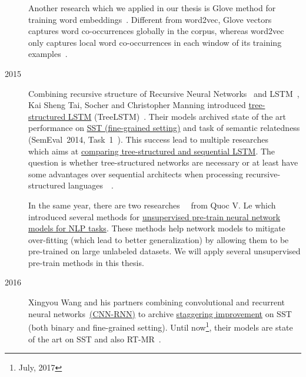 \begin{description}
Another research which we applied in our thesis is Glove method for training word embeddings~\cite{glove}.
Different from word2vec, Glove vectors captures word co-occurrences globally in the corpus, whereas word2vec only captures local word co-occurrences in each window of its training examples~\cite{glove}.

\item [2015] Combining recursive structure of Recursive Neural Networks~\cite{socher2013recursive} and LSTM~\cite{originLSTM}, Kai Sheng Tai, Socher and Christopher Manning introduced \hyperref[sec:treelstm]{tree-structured LSTM}  (TreeLSTM)~\cite{treeLSTM}.
Their models archived state of the art performance on \hyperref[sec:sst]{SST (fine-grained setting)} and task of semantic relatedness (SemEval~2014, Task~1~\cite{SemeEvalTask1}).
This success lead to multiple researches~\cite{need-tree}~\cite{bowman-treevslstm}~\cite{Graves_Nature2016} which aims at \hyperref[treelstm-advantage]{comparing tree-structured and sequential LSTM}. 
The question is whether tree-structured networks are necessary or at least have some advantages over sequential architects when processing recursive-structured languages~\cite{need-tree}~\cite{bowman-treevslstm}.   

In the same year, there are two researches~\cite{ParagraphVec}~\cite{semisup-seq2seq} from Quoc V. Le which introduced several methods for \hyperref[sec:unsupervised-pretrain]{unsupervised pre-train neural network models for NLP tasks}.
These methods help network models to mitigate over-fitting (which lead to better generalization) by allowing them to be pre-trained on large unlabeled datasets.
We will apply several unsupervised pre-train methods in this thesis.

\item [2016] Xingyou Wang and his partners combining convolutional and recurrent neural networks~\hyperref[cnn-rnn]{(CNN-RNN)} to archive \hyperref[table:cnn-rnn]{staggering improvement} on SST (both binary and fine-grained setting).
Until now\footnote{July, 2017}, their models are state of the art on SST and also RT-MR~\cite{cnn-rnn}.
\end{description}  


